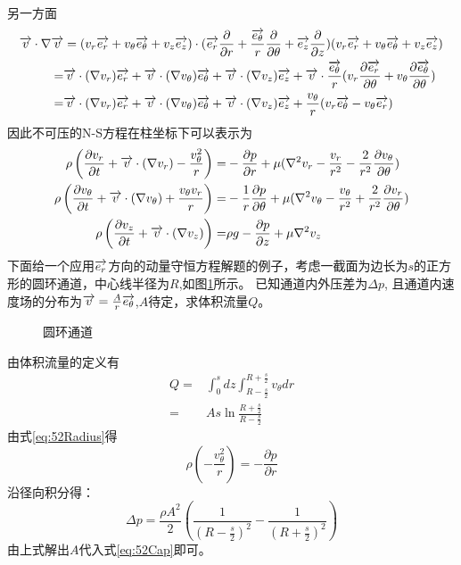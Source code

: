  另一方面
 \begin{align*}
 \overrightarrow{v}\cdot\nabla \overrightarrow{v} &= (v_r \overrightarrow{e_r}+v_{\theta}\overrightarrow{e_{\theta}}+v_z\overrightarrow{e_z})
 \cdot (\overrightarrow{e_r}\frac{\partial}{\partial r}+\frac{\overrightarrow{e_{\theta}}}{r}\frac{\partial}{\partial \theta }+\overrightarrow{e_z}\frac{\partial}{\partial z})
 (v_r \overrightarrow{e_r}+v_{\theta}\overrightarrow{e_{\theta}}+v_z\overrightarrow{e_z})\\
 =& \overrightarrow{v}\cdot(\nabla v_r)\overrightarrow{e_r}+\overrightarrow{v}\cdot(\nabla v_{\theta})\overrightarrow{e_{\theta}}+\overrightarrow{v}\cdot(\nabla v_z)\overrightarrow{e_z}+
 \overrightarrow{v}\cdot 
 \frac{\overrightarrow{e_{\theta}}}{r} (v_r \frac{\partial \overrightarrow{e_r}}{\partial \theta }+v_{\theta}\frac{\partial \overrightarrow{e_{\theta}}}{\partial \theta })\\
 =& \overrightarrow{v}\cdot(\nabla v_r)\overrightarrow{e_r}+\overrightarrow{v}\cdot(\nabla v_{\theta})\overrightarrow{e_{\theta}}+\overrightarrow{v}\cdot(\nabla v_z)\overrightarrow{e_z}+
 \frac{v_{\theta}}{r} (v_r \overrightarrow{e_{\theta}}-v_{\theta}\overrightarrow{e_r})
 \end{align*}
 因此不可压的N-S方程在柱坐标下可以表示为
 \begin{align}
 \rho\left(\frac{\partial v_r}{\partial t}+\overrightarrow{v}\cdot(\nabla v_r)-\frac{v_{\theta}^2}{r}\right)=&-\frac{\partial p}{\partial r}+
 \mu (\nabla^2 v_r-\frac{v_r}{r^2}-\frac{2}{r^2}\frac{\partial v_{\theta}}{\partial \theta})\label{eq:52Radius}\\
 \rho\left(\frac{\partial v_{\theta}}{\partial t}+\overrightarrow{v}\cdot(\nabla v_{\theta})+\frac{v_{\theta}v_r}{r}\right)=&-\frac{1}{r}\frac{\partial p}{\partial {\theta}}+
 \mu (\nabla^2 v_{\theta}-\frac{v_{\theta}}{r^2}+\frac{2}{r^2}\frac{\partial v_r}{\partial \theta})\\
 \rho\left(\frac{\partial v_z}{\partial t}+\overrightarrow{v}\cdot(\nabla v_z)\right)=&\rho g -\frac{\partial p}{\partial z}+ \mu \nabla^2 v_z
 \end{align}
 下面给一个应用$\overrightarrow{e_r}$方向的动量守恒方程解题的例子，考虑一截面为边长为$s$的正方形的圆环通道，中心线半径为$R$,如图\ref{fig:52C}所示。
 已知通道内外压差为$\Delta p$,
 且通道内速度场的分布为$\overrightarrow{v}=\frac{A}{r}\overrightarrow{e_{\theta}}$,$A$待定，求体积流量$Q$。
 \begin{figure}[!ht]
 \centering
 
 \caption{圆环通道}\label{fig:52C}
 \end{figure}
 
 由体积流量的定义有
 \begin{align}
 Q=&\int_{0}^s dz \int_{R-\frac{s}{2}}^{R+\frac{s}{2}} v_{\theta} dr\\
 =& As\ln\frac{R+\frac{s}{2}}{R-\frac{s}{2}}\label{eq:52Cap}
 \end{align}
 由式\eqref{eq:52Radius}得
  \begin{equation}
  \rho(-\frac{v^2_{\theta}}{r})=-\frac{\partial p}{\partial r}
 \end{equation}
 沿径向积分得：
  \begin{equation}
  \Delta p=\frac{\rho A^2}{2} \left(\frac{1}{(R-\frac{s}{2})^2}-\frac{1}{(R+\frac{s}{2})^2}\right)
 \end{equation}
 由上式解出$A$代入式\eqref{eq:52Cap}即可。